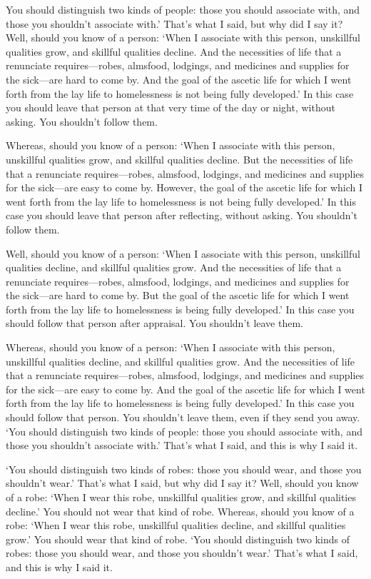 \documentclass[12pt,openany]{book}%
\begin{document}
You should distinguish two kinds of people: those you should associate with, and those you shouldn’t associate with.’ That’s what I said, but why did I say it? Well, should you know of a person: ‘When I associate with this person, unskillful qualities grow, and skillful qualities decline. And the necessities of life that a renunciate requires—robes, almsfood, lodgings, and medicines and supplies for the sick—are hard to come by. And the goal of the ascetic life for which I went forth from the lay life to homelessness is not being fully developed.’ In this case you should leave that person at that very time of the day or night, without asking. You shouldn’t follow them. 

Whereas, should you know of a person: ‘When I associate with this person, unskillful qualities grow, and skillful qualities decline. But the necessities of life that a renunciate requires—robes, almsfood, lodgings, and medicines and supplies for the sick—are easy to come by. However, the goal of the ascetic life for which I went forth from the lay life to homelessness is not being fully developed.’ In this case you should leave that person after reflecting, without asking. You shouldn’t follow them. 

Well, should you know of a person: ‘When I associate with this person, unskillful qualities decline, and skillful qualities grow. And the necessities of life that a renunciate requires—robes, almsfood, lodgings, and medicines and supplies for the sick—are hard to come by. But the goal of the ascetic life for which I went forth from the lay life to homelessness is being fully developed.’ In this case you should follow that person after appraisal. You shouldn’t leave them. 

Whereas, should you know of a person: ‘When I associate with this person, unskillful qualities decline, and skillful qualities grow. And the necessities of life that a renunciate requires—robes, almsfood, lodgings, and medicines and supplies for the sick—are easy to come by. And the goal of the ascetic life for which I went forth from the lay life to homelessness is being fully developed.’ In this case you should follow that person. You shouldn’t leave them, even if they send you away. ‘You should distinguish two kinds of people: those you should associate with, and those you shouldn’t associate with.’ That’s what I said, and this is why I said it. 

‘You should distinguish two kinds of robes: those you should wear, and those you shouldn’t wear.’ That’s what I said, but why did I say it? Well, should you know of a robe: ‘When I wear this robe, unskillful qualities grow, and skillful qualities decline.’ You should not wear that kind of robe. Whereas, should you know of a robe: ‘When I wear this robe, unskillful qualities decline, and skillful qualities grow.’ You should wear that kind of robe. ‘You should distinguish two kinds of robes: those you should wear, and those you shouldn’t wear.’ That’s what I said, and this is why I said it. 
\end{document}
